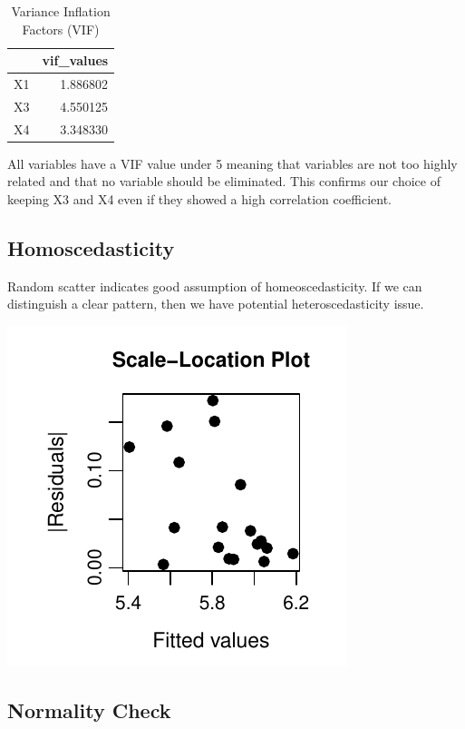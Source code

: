 \documentclass[
  11pt,
]{article}
\begin{document}
\begingroup\fontsize{8}{10}\selectfont

\begin{longtable}[t]{lr}
\caption{\label{tab:unnamed-chunk-20}Variance Inflation Factors (VIF)}\\
\toprule
 & vif\_values\\
\midrule
X1 & 1.886802\\
X3 & 4.550125\\
X4 & 3.348330\\
\bottomrule
\end{longtable}
\endgroup{}

All variables have a VIF value under 5 meaning that variables are not
too highly related and that no variable should be eliminated. This
confirms our choice of keeping X3 and X4 even if they showed a high
correlation coefficient.

\subsection{Homoscedasticity}\label{homoscedasticity}

Random scatter indicates good assumption of homeoscedasticity. If we can
distinguish a clear pattern, then we have potential heteroscedasticity
issue.

\includegraphics{Figs/unnamed-chunk-21-1.pdf}

\subsection{Normality Check}\label{normality-check}
\end{document}
